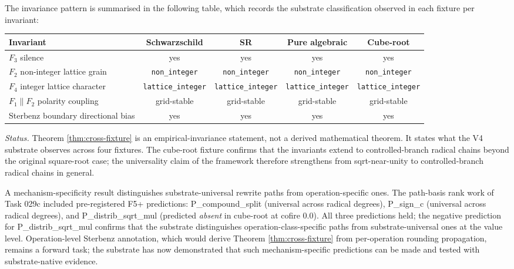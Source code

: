 \documentclass[11pt,a4paper]{article}
\begin{document}
The invariance pattern is summarised in the following table, which records the substrate classification observed in each fixture per invariant:

\begin{center}
\begin{tabular}{lcccc}
\toprule
Invariant & Schwarzschild & SR & Pure algebraic & Cube-root \\
\midrule
$F_3$ silence & yes & yes & yes & yes \\
$F_2$ non-integer lattice grain & \texttt{non\_integer} & \texttt{non\_integer} & \texttt{non\_integer} & \texttt{non\_integer} \\
$F_4$ integer lattice character & \texttt{lattice\_integer} & \texttt{lattice\_integer} & \texttt{lattice\_integer} & \texttt{lattice\_integer} \\
$F_1 \parallel F_2$ polarity coupling & grid-stable & grid-stable & grid-stable & grid-stable \\
Sterbenz boundary directional bias & yes & yes & yes & yes \\
\bottomrule
\end{tabular}
\end{center}

\noindent\emph{Status.} Theorem \ref{thm:cross-fixture} is an empirical-invariance statement, not a derived mathematical theorem. It states what the V4 substrate observes across four fixtures. The cube-root fixture confirms that the invariants extend to controlled-branch radical chains beyond the original square-root case; the universality claim of the framework therefore strengthens from sqrt-near-unity to controlled-branch radical chains in general.

A mechanism-specificity result distinguishes substrate-universal rewrite paths from operation-specific ones. The path-basis rank work of Task 029c included pre-registered F5+ predictions: P\_compound\_split (universal across radical degrees), P\_sign\_c (universal across radical degrees), and P\_distrib\_sqrt\_mul (predicted \emph{absent} in cube-root at cofire 0.0). All three predictions held; the negative prediction for P\_distrib\_sqrt\_mul confirms that the substrate distinguishes operation-class-specific paths from substrate-universal ones at the value level. Operation-level Sterbenz annotation, which would derive Theorem \ref{thm:cross-fixture} from per-operation rounding propagation, remains a forward task; the substrate has now demonstrated that such mechanism-specific predictions can be made and tested with substrate-native evidence.
\end{document}
